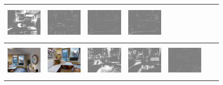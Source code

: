 \documentclass[letterpaper, 10 pt, conference]{ieeeconf}  %
\begin{document}
\begin{figure}[h!]
\begin{center}
\begin{tabular}{|c| c |c | c | c | c | c|}
           \includegraphics[width=18mm, height=17mm]{ICRA17/EUDORA/ferror.png} & 
 \includegraphics[width=18mm, height=17mm]{TrueDepth/EUDORA/ferror.png} &
  \includegraphics[width=18mm, height=17mm]{DepthNetwork/EUDORA/ferror.png} &
   \includegraphics[width=18mm, height=17mm]{FlowDepth/EUDORA/ferror.png}
 \\ \hline
\hline \hline
\includegraphics[width=18mm, height=17mm]{TrueDepth/QUANTICO/init.png} &   
            \includegraphics[width=18mm, height=17mm]{TrueDepth/QUANTICO/des.png} & 
           \includegraphics[width=18mm, height=17mm]{PhotoVS/QUANTICO/ferror.png} &\includegraphics[width=18mm, height=17mm]{ICRA17/QUANTICO/ferror.png} & 
 \includegraphics[width=18mm, height=17mm]{TrueDepth/QUANTICO/ferror.png} &

\end{tabular}
\end{center}
\end{figure}
\end{document}
